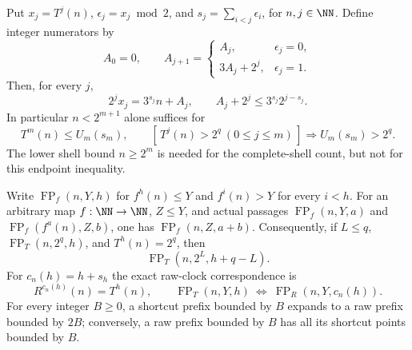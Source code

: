 \begin{proposition}
\label{prop:Shaik-core-certificate}
Put \(x_j=T^j(n)\), \(\epsilon_j=x_j\bmod2\), and
\(s_j=\sum_{i<j}\epsilon_i\), for \(n,j\in\NN\).
Define integer numerators by
\[
 A_0=0,\qquad
 A_{j+1}=
 \begin{cases}
 A_j,&\epsilon_j=0,\\
 3A_j+2^j,&\epsilon_j=1.
 \end{cases}
\]
Then, for every \(j\),
\begin{equation}\label{eq:Shaik-core-affine}
 2^jx_j=3^{s_j}n+A_j,\qquad
 A_j+2^j\le3^{s_j}2^{j-s_j}.
\end{equation}
In particular \(n<2^{m+1}\) alone suffices for
\[
 T^m(n)\le U_m(s_m),\qquad
 [\,T^j(n)>2^q\ (0\le j\le m)\,]\Longrightarrow
 U_m(s_m)>2^q .
\]
The lower shell bound \(n\ge2^m\) is needed for the complete-shell
count, but not for this endpoint inequality.

Write \(\operatorname{FP}_f(n,Y,h)\) for
\(f^h(n)\le Y\) and \(f^i(n)>Y\) for every \(i<h\).
For an arbitrary map \(f:\NN\to\NN\), \(Z\le Y\), and actual passages
\(\operatorname{FP}_f(n,Y,a)\) and
\(\operatorname{FP}_f(f^a(n),Z,b)\), one has
\(\operatorname{FP}_f(n,Z,a+b)\).
Consequently, if \(L\le q\), \(\operatorname{FP}_T(n,2^q,h)\),
and \(T^h(n)=2^q\), then
\[
 \operatorname{FP}_T(n,2^L,h+q-L).
\]
For \(c_n(h)=h+s_h\) the exact raw-clock correspondence is
\[
 R^{c_n(h)}(n)=T^h(n),\qquad
 \operatorname{FP}_T(n,Y,h)
 \ \Longleftrightarrow\
 \operatorname{FP}_R(n,Y,c_n(h)).
\]
For every integer \(B\ge0\), a shortcut prefix bounded by \(B\)
expands to a raw prefix bounded by \(2B\); conversely, a raw prefix
bounded by \(B\) has all its shortcut points bounded by \(B\).
\end{proposition}
